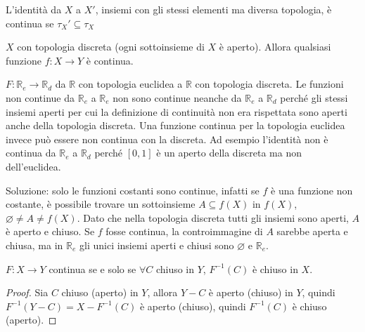 \begin{example}
    L'identità da \(X\) a \(X'\), insiemi con gli stessi elementi ma diversa
    topologia, è continua se \(\tau_X' \subseteq \tau_X\) 
\end{example}
\begin{example}
    \(X\) con topologia discreta (ogni sottoinsieme di \(X\) è aperto).
    Allora qualsiasi funzione \(f: X \to Y\) è continua.
\end{example}
\begin{example}
    \(F: \mathbb{R}_e \to \mathbb{R}_d\) da $\mathbb{R}$ con topologia euclidea a
    \(\mathbb{R}\) con topologia discreta. Le funzioni non continue da
    \(\mathbb{R}_e\) a \(\mathbb{R}_e\) non sono continue neanche da
    \(\mathbb{R}_e\) a \(\mathbb{R}_d\) perché gli stessi insiemi aperti per cui
    la definizione di continuità non era rispettata sono aperti anche
    della topologia discreta. Una funzione continua per la topologia euclidea
    invece può essere non continua con la discreta. Ad esempio l'identità
    non è continua da \(\mathbb{R}_e\) a \(\mathbb{R}_d\) perché \([0, 1]\) è un aperto della discreta ma non
    dell'euclidea.

    Soluzione: solo le funzioni costanti sono continue, infatti se \(f\) è una
    funzione non costante, è possibile trovare un sottoinsieme \(A \subseteq f(X)\) in
    \(f(X)\), \(\varnothing \neq A \neq f(X)\). Dato che nella
    topologia discreta tutti gli insiemi sono aperti, \(A\) è aperto
    e chiuso. Se \(f\) fosse continua, la controimmagine di \(A\) sarebbe aperta
    e chiusa, ma in \(\mathbb{R}_e\) gli unici insiemi aperti e chiusi sono
    \(\varnothing \text{ e } \mathbb{R}_e\).
    
\end{example}

\begin{proposition}
    \(F: X \to Y\) continua se e solo se \(\forall C\) chiuso in \(Y\),
    \(F^{-1}(C)\) è chiuso in \(X\).
\end{proposition}
\begin{proof}
    Sia \(C\) chiuso (aperto) in \(Y\), allora \(Y - C\) è aperto (chiuso)
        in \(Y\), quindi \(F^{-1}(Y - C) = X - F^{-1}(C)\) è aperto (chiuso), quindi
        \(F^{-1}(C)\) è chiuso (aperto).
\end{proof}

